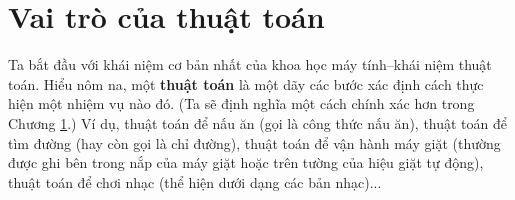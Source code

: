 
\section{Vai trò của thuật toán}

Ta bắt đầu với khái niệm cơ bản nhất của khoa học máy tính--khái niệm thuật toán. Hiểu nôm
na, một \textbf{thuật toán} là một dãy các bước xác định cách thực hiện một nhiệm vụ nào
đó.  (Ta sẽ định nghĩa một cách chính xác hơn trong Chương \ref{}.) Ví dụ, thuật toán
để nấu ăn (gọi là công thức nấu ăn), thuật toán để tìm đường (hay còn gọi là chỉ đường),
thuật toán để vận hành máy giặt (thường được ghi bên trong nắp của máy giặt hoặc trên
tường của hiệu giặt tự động), thuật toán để chơi nhạc (thể hiện dưới dạng các bản
nhạc)...






